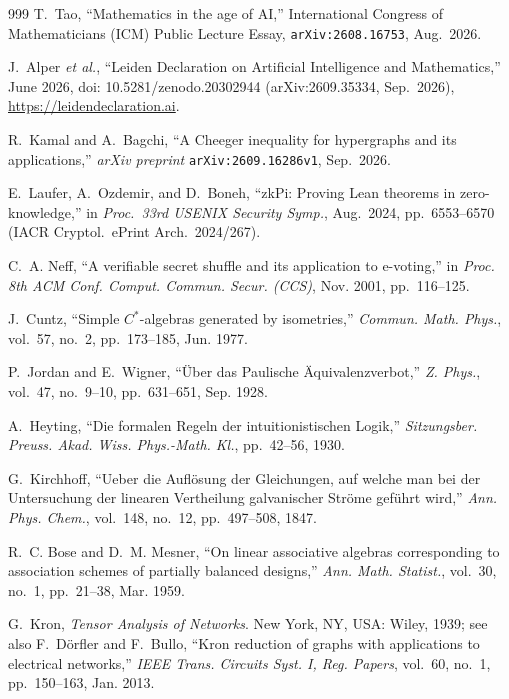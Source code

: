 \documentclass[11pt,letterpaper]{article}
\theoremstyle{spectralthm}
\begin{document}
\begin{thebibliography}{999}
T.~Tao, ``Mathematics in the age of AI,'' International Congress of Mathematicians (ICM) Public Lecture Essay, \texttt{arXiv:2608.16753}, Aug.\ 2026.

J.~Alper \emph{et al.}, ``Leiden Declaration on Artificial Intelligence and Mathematics,'' June 2026, doi: 10.5281/zenodo.20302944 (arXiv:2609.35334, Sep.\ 2026), \url{https://leidendeclaration.ai}.

R.~Kamal and A.~Bagchi, ``A Cheeger inequality for hypergraphs and its applications,'' \textit{arXiv preprint} \texttt{arXiv:2609.16286v1}, Sep.\ 2026.

E.~Laufer, A.~Ozdemir, and D.~Boneh, ``zkPi: Proving Lean theorems in zero-knowledge,'' in \emph{Proc.\ 33rd USENIX Security Symp.}, Aug.\ 2024, pp.~6553--6570 (IACR Cryptol.\ ePrint Arch.\ 2024/267).

C.~A. Neff, ``A verifiable secret shuffle and its application to e-voting,'' in \emph{Proc. 8th ACM Conf. Comput. Commun. Secur. (CCS)}, Nov. 2001, pp.~116--125.

J.~Cuntz, ``Simple $C^*$-algebras generated by isometries,'' \emph{Commun. Math. Phys.}, vol.~57, no.~2, pp.~173--185, Jun. 1977.

P.~Jordan and E.~Wigner, ``\"{U}ber das Paulische \"{A}quivalenzverbot,'' \emph{Z. Phys.}, vol.~47, no.~9--10, pp.~631--651, Sep. 1928.

A.~Heyting, ``Die formalen Regeln der intuitionistischen Logik,'' \emph{Sitzungsber. Preuss. Akad. Wiss. Phys.-Math. Kl.}, pp.~42--56, 1930.

G.~Kirchhoff, ``Ueber die Aufl\"{o}sung der Gleichungen, auf welche man bei der Untersuchung der linearen Vertheilung galvanischer Str\"{o}me gef\"{u}hrt wird,'' \emph{Ann. Phys. Chem.}, vol.~148, no.~12, pp.~497--508, 1847.

R.~C. Bose and D.~M. Mesner, ``On linear associative algebras corresponding to association schemes of partially balanced designs,'' \emph{Ann. Math. Statist.}, vol.~30, no.~1, pp.~21--38, Mar. 1959.

G.~Kron, \emph{Tensor Analysis of Networks}. New York, NY, USA: Wiley, 1939; see also F.~D\"{o}rfler and F.~Bullo, ``Kron reduction of graphs with applications to electrical networks,'' \emph{IEEE Trans. Circuits Syst. I, Reg. Papers}, vol.~60, no.~1, pp.~150--163, Jan. 2013.


\end{thebibliography}
\end{document}
